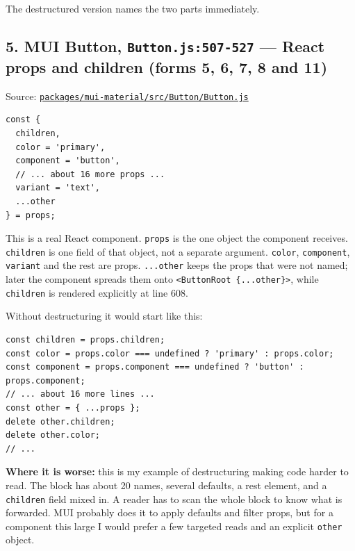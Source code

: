 \documentclass[
  11pt,
]{article}
\begin{document}
The destructured version names the two parts immediately.

\subsection{\texorpdfstring{5. MUI Button, \texttt{Button.js:507-527}
--- React props and children (forms 5, 6, 7, 8 and
11)}{5. MUI Button, Button.js:507-527 --- React props and children (forms 5, 6, 7, 8 and 11)}}\label{mui-button-button.js507-527-react-props-and-children-forms-5-6-7-8-and-11}

Source:
\href{https://github.com/mui/material-ui/blob/9f8fe586afb3d81f4108a96f3b943a0990ee3f08/packages/mui-material/src/Button/Button.js\#L507-L527}{\texttt{packages/mui-material/src/Button/Button.js}}

\begin{lstlisting}
const {
  children,
  color = 'primary',
  component = 'button',
  // ... about 16 more props ...
  variant = 'text',
  ...other
} = props;
\end{lstlisting}

This is a real React component. \texttt{props} is the
one object the component receives. \texttt{children} is
one field of that object, not a separate argument.
\texttt{color}, \texttt{component},
\texttt{variant} and the rest are props.
\texttt{...other} keeps the props that were not named;
later the component spreads them onto
\texttt{\textless{}ButtonRoot \{...other\}\textgreater{}}, while
\texttt{children} is rendered explicitly at line 608.

Without destructuring it would start like this:

\begin{lstlisting}
const children = props.children;
const color = props.color === undefined ? 'primary' : props.color;
const component = props.component === undefined ? 'button' : props.component;
// ... about 16 more lines ...
const other = { ...props };
delete other.children;
delete other.color;
// ...
\end{lstlisting}

\textbf{Where it is worse:} this is my example of destructuring making
code harder to read. The block has about 20 names, several defaults, a
rest element, and a \texttt{children} field mixed in. A
reader has to scan the whole block to know what is forwarded. MUI
probably does it to apply defaults and filter props, but for a component
this large I would prefer a few targeted reads and an explicit
\texttt{other} object.
\end{document}

